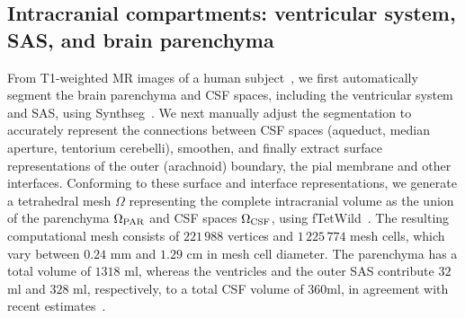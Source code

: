 \documentclass[fleqn,10pt]{wlscirep}
\newcommand{\mer}[1]{\textcolor{magenta}{#1}}
\begin{document}

\subsection*{Intracranial compartments: ventricular system, SAS, and brain parenchyma}

From T1-weighted MR images of a human subject~\cite{hodneland2019new},
we first automatically segment the brain parenchyma and CSF spaces,
including the ventricular system and SAS, using
Synthseg~\cite{billot2023robust,billot2023synthseg}. We next manually
adjust the segmentation to accurately represent the connections
between CSF spaces (aqueduct, median aperture, tentorium cerebelli), smoothen, and finally
extract surface representations of the outer (arachnoid) boundary, the
pial membrane and other interfaces. Conforming to these surface and
interface representations, we generate a tetrahedral mesh $\Omega$
representing the complete intracranial volume as the union of the
parenchyma $\Omega_{\rm PAR}$ and CSF spaces $\Omega_{\rm CSF}$, using
fTetWild~\cite{hu2020fast}. The resulting computational mesh consists
of $221\,988$ vertices and $1\,225\,774$ mesh cells, which vary between
$0.24$ mm and $1.29$ cm in mesh cell diameter. The parenchyma has a
total volume of $1318$ ml, whereas the ventricles and the outer SAS
contribute $32$ ml and $328$ ml, respectively, to a total CSF volume
of $360$ml, in agreement with recent estimates~\cite{hladky2024regulation}.


\end{document}
